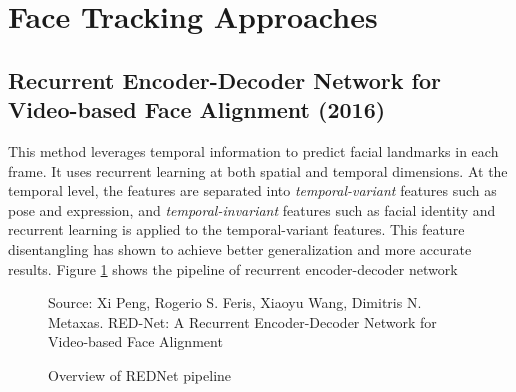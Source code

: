 \documentclass{llncs}
\begin{document}
\section{Face Tracking Approaches}

\subsection{Recurrent Encoder-Decoder Network for Video-based Face Alignment (2016) \textcolor{green}{\cite{rednet}}}

This method leverages temporal information to predict facial landmarks in each frame. It uses recurrent learning at both spatial and temporal dimensions. At the temporal level, the features are separated into \textit{temporal-variant} features such as pose and expression, and \textit{temporal-invariant} features such as facial identity and recurrent learning is applied to the temporal-variant features. This feature disentangling has shown to achieve better generalization and more accurate results. Figure \textcolor{red}{\ref{rednet_architecture}} shows the pipeline of recurrent encoder-decoder network \\

\begin{figure}
%
{Source: Xi Peng, Rogerio S. Feris, Xiaoyu Wang, Dimitris N. Metaxas. RED-Net: A Recurrent Encoder-Decoder Network for Video-based Face Alignment}
\caption{Overview of REDNet pipeline}
\label{rednet_architecture}
\end{figure}
\end{document}
